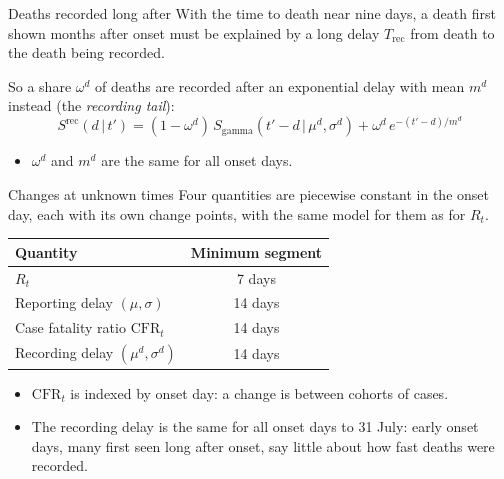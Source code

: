 \documentclass[aspectratio=169,9pt]{beamer}
\newcommand{\given}{\,|\,}
\newcommand{\cfr}{\mathrm{CFR}}
\begin{document}
\begin{frame}{Deaths recorded long after}
With the time to death near nine days, a death first shown months after
onset must be explained by a long delay $T_{\text{rec}}$ from death to the
death being recorded.

\bigskip
So a share $\omega^{d}$ of deaths are recorded after an exponential delay
with mean $m^{d}$ instead (the \emph{recording tail}):
\[
S^{\text{rec}}(d\given t')=(1-\omega^{d})\,S_{\mathrm{gamma}}(t'-d\given\mu^{d},\sigma^{d})
+\omega^{d}\,e^{-(t'-d)/m^{d}}
\]

\begin{itemize}
\item $\omega^{d}$ and $m^{d}$ are the same for all onset days.
\end{itemize}
\end{frame}

\begin{frame}{Changes at unknown times}
Four quantities are piecewise constant in the onset day, each with its own
change points, with the same model for them as for $R_t$.

\bigskip
\begin{center}
\renewcommand{\arraystretch}{1.35}
\begin{tabular}{lc}
\toprule
Quantity & Minimum segment \\
\midrule
$R_t$ & 7 days \\
Reporting delay $(\mu,\sigma)$ & 14 days \\
Case fatality ratio $\cfr_t$ & 14 days \\
Recording delay $(\mu^{d},\sigma^{d})$ & 14 days \\
\bottomrule
\end{tabular}
\end{center}

\bigskip
\begin{itemize}
\item $\cfr_t$ is indexed by onset day: a change is between cohorts of cases.
\item The recording delay is the same for all onset days to 31 July: early
onset days, many first seen long after onset, say little about how fast
deaths were recorded.
\end{itemize}
\end{frame}
\end{document}
